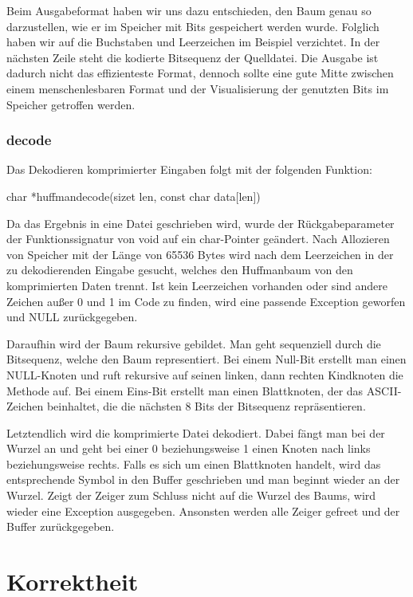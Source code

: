 \documentclass[course=erap]{aspdoc}
\begin{document}
Beim Ausgabeformat haben wir uns dazu entschieden, den Baum genau so darzustellen, wie er im Speicher mit Bits gespeichert werden wurde. Folglich haben wir auf die Buchstaben und Leerzeichen im Beispiel verzichtet. In der nächsten Zeile steht die kodierte Bitsequenz der Quelldatei. Die Ausgabe ist dadurch nicht das effizienteste Format, dennoch sollte eine gute Mitte zwischen einem menschenlesbaren Format und der Visualisierung der genutzten Bits im Speicher getroffen werden.

\subsubsection{decode}

Das Dekodieren komprimierter Eingaben folgt mit der folgenden Funktion:
\begin{center}
    char *huffman\textunderscore decode(size\textunderscore t len, const char data[len])
\end{center}
Da das Ergebnis in eine Datei geschrieben wird, wurde der Rückgabeparameter der Funktionssignatur von void auf ein char-Pointer geändert. Nach Allozieren von Speicher mit der Länge von 65536 Bytes wird nach dem Leerzeichen in der zu dekodierenden Eingabe gesucht, welches den Huffmanbaum von den komprimierten Daten trennt. Ist kein Leerzeichen vorhanden oder sind andere Zeichen außer 0 und 1 im Code zu finden, wird eine passende Exception geworfen und NULL zurückgegeben.

Daraufhin wird der Baum rekursive gebildet. Man geht sequenziell durch die Bitsequenz, welche den Baum representiert. Bei einem Null-Bit erstellt man einen NULL-Knoten und ruft rekursive auf seinen linken, dann rechten Kindknoten die Methode auf. Bei einem Eins-Bit erstellt man einen Blattknoten, der das ASCII-Zeichen beinhaltet, die die nächsten 8 Bits der Bitsequenz repräsentieren.

Letztendlich wird die komprimierte Datei dekodiert. Dabei fängt man bei der Wurzel an und geht bei einer 0 beziehungsweise 1 einen Knoten nach links beziehungsweise rechts. Falls es sich um einen Blattknoten handelt, wird das entsprechende Symbol in den Buffer geschrieben und man beginnt wieder an der Wurzel. Zeigt der Zeiger zum Schluss nicht auf die Wurzel des Baums, wird wieder eine Exception ausgegeben.
Ansonsten werden alle Zeiger gefreet und der Buffer zurückgegeben.

\section{Korrektheit}
\end{document}
